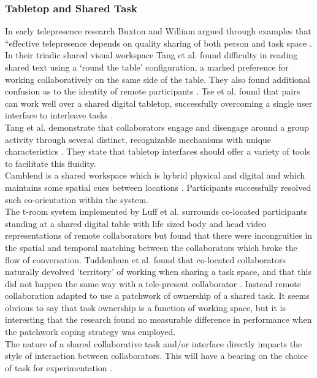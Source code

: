 \subsubsection{Tabletop and Shared Task}
In early telepresence research Buxton and William argued through examples that ``effective telepresence depends on quality sharing of both person and task space \cite{Buxton1992a}.\\
In their triadic shared visual workspace Tang et al. found difficulty in reading shared text using a `round the table' configuration, a marked preference for working collaboratively on the same side of the table. They also found additional confusion as to the identity of remote participants \cite{Tang2010}.
Tse et al. found that pairs can work well over a shared digital tabletop, successfully overcoming a single user interface to interleave tasks \cite{Tse2007}.\\
Tang et al. demonstrate that collaborators engage and disengage around a group activity through several distinct, recognizable mechanisms with unique characteristics \cite{Tang2006}. They state that tabletop interfaces should offer a variety of tools to facilitate this fluidity.\\
Camblend is a shared workspace which is hybrid physical and digital and which maintains some spatial cues between locations \cite{Norris2013a, Norris2012}. Participants successfully resolved such co-orientation within the system.\\
The t-room system implemented by Luff et al. surrounds co-located participants standing at a shared digital table with life sized body and head video representations of remote collaborators \cite{Luff2011} but found that there were incongruities in the spatial and temporal matching between the collaborators which broke the flow of conversation.
Tuddenham et al. found that co-located collaborators naturally devolved 'territory' of working when sharing a task space, and that this did not happen the same way with a tele-present collaborator \cite{tuddenham2009territorial}. Instead remote collaboration adapted to use a patchwork of ownership of a shared task. It seems obvious to say that task ownership is a function of working space, but it is interesting that the research found no measurable difference in performance when the patchwork coping strategy was employed.\\
The nature of a shared collaborative task and/or interface directly impacts the style of interaction between collaborators. This will have a bearing on the choice of task for experimentation \cite{Jamil2011, Jetter2011a}.

